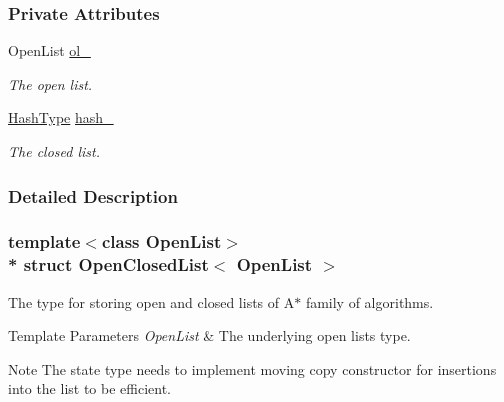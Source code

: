 \subsubsection*{Private Attributes}
\begin{DoxyCompactItemize}
\item 
Open\+List \hyperlink{structOpenClosedList_a6092865bc79a9743c6e8ff13436a2d2c}{ol\+\_\+}\hypertarget{structOpenClosedList_a6092865bc79a9743c6e8ff13436a2d2c}{}\label{structOpenClosedList_a6092865bc79a9743c6e8ff13436a2d2c}

\begin{DoxyCompactList}\small\item\em The open list. \end{DoxyCompactList}\item 
\hyperlink{structOpenClosedList_a4d6714df3a19f272fef2f0ca7fb7a1b7}{Hash\+Type} \hyperlink{structOpenClosedList_a4565a9374e8450a13fed0a1b99731347}{hash\+\_\+}\hypertarget{structOpenClosedList_a4565a9374e8450a13fed0a1b99731347}{}\label{structOpenClosedList_a4565a9374e8450a13fed0a1b99731347}

\begin{DoxyCompactList}\small\item\em The closed list. \end{DoxyCompactList}\end{DoxyCompactItemize}


\subsubsection{Detailed Description}
\subsubsection*{template$<$class Open\+List$>$\\*
struct Open\+Closed\+List$<$ Open\+List $>$}

The type for storing open and closed lists of {\ttfamily A$\ast$} family of algorithms. 


\begin{DoxyTemplParams}{Template Parameters}
{\em Open\+List} & The underlying open list\textquotesingle{}s type. \\
\hline
\end{DoxyTemplParams}
\begin{DoxyNote}{Note}
The state type needs to implement moving copy constructor for insertions into the list to be efficient. 
\end{DoxyNote}


